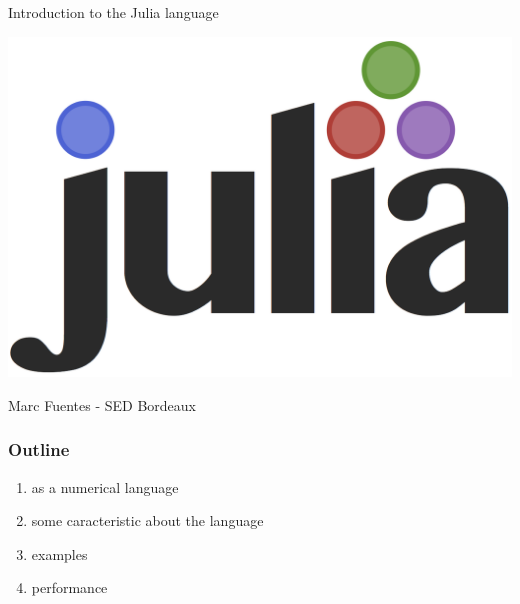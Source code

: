 \documentclass[11pt,mathserif]{beamer}
\begin{document}
\begin{frame}
\begin{center}
{\Large Introduction to the Julia language }
\end{center}
\vspace{1cm}
\includegraphics[width=0.5\linewidth]{figures/julia.png}
\vspace{1cm}
\begin{center}
{\large Marc Fuentes - SED Bordeaux \\}
\end{center}
\end{frame}


\begin{frame}[fragile]
\frametitle{Outline}
\begin{enumerate}[<+->]
\item \julia as a numerical language 
\item some caracteristic about the language
\item examples 
\item performance
\end{enumerate}
\end{frame}
\end{document}
